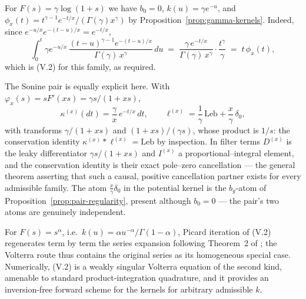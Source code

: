 \begin{example}\label{ex:gamma-volterra}
For $F(s) = \gamma\log(1+s)$ we have $b_0 = 0$, $k(u) = \gamma e^{-u}$, and
$\phi_x(t) = t^{\gamma-1}e^{-t/x}/(\Gamma(\gamma)x^\gamma)$ by
Proposition~\ref{prop:gamma-kernels}. Indeed, since $e^{-u/x}e^{-(t-u)/x} = e^{-t/x}$,
\[
  \int_0^t \gamma e^{-u/x}\,\frac{(t-u)^{\gamma-1} e^{-(t-u)/x}}{\Gamma(\gamma)\,x^{\gamma}}\,du
  \;=\; \frac{\gamma\, e^{-t/x}}{\Gamma(\gamma)\,x^{\gamma}} \cdot \frac{t^{\gamma}}{\gamma}
  \;=\; t\,\phi_x(t),
\]
which is (V.2) for this family, as required.

The Sonine pair is equally explicit here. With $\varphi_x(s) = sF'(xs) = \gamma s/(1+xs)$,
\[
  \kappa^{(x)}(dt) = \frac{\gamma}{x}\,e^{-t/x}\,dt, \qquad
  \ell^{(x)} = \frac{1}{\gamma}\,\mathrm{Leb} + \frac{x}{\gamma}\,\delta_0,
\]
with transforms $\gamma/(1+xs)$ and $(1+xs)/(\gamma s)$, whose product is $1/s$: the
conservation identity $\kappa^{(x)} * \ell^{(x)} = \mathrm{Leb}$ by inspection. In filter
terms $D^{(x)}$ is the leaky differentiator $\gamma s/(1+xs)$ and $I^{(x)}$ a
proportional--integral element, and the conservation identity is their exact pole--zero
cancellation --- the general theorem asserting that such a causal, positive cancellation
partner exists for every admissible family. The atom
$\tfrac{x}{\gamma}\delta_0$ in the potential kernel is the $b_g$-atom of
Proposition~\ref{prop:pair-regularity}, present although $b_0 = 0$ --- the pair's two atoms
are genuinely independent.
\end{example}

\begin{remark}\label{rem:volterra-computation}
For $F(s) = s^\alpha$, i.e.\ $k(u) = \alpha u^{-\alpha}/\Gamma(1-\alpha)$, Picard iteration of
(V.2) regenerates term by term the series expansion following Theorem~2 of
; the Volterra route thus contains the original series as its
homogeneous special case. Numerically, (V.2) is a weakly singular Volterra equation of the
second kind, amenable to standard product-integration quadrature, and it provides an
inversion-free forward scheme for the kernels for arbitrary admissible $k$.
\end{remark}

